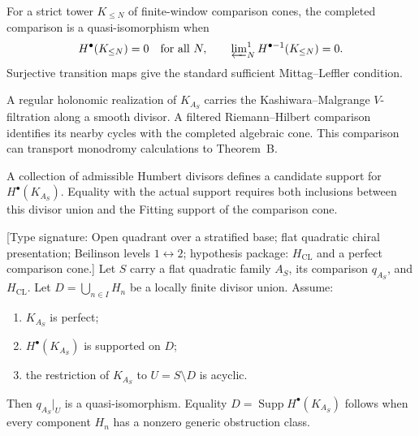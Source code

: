 \begin{remark}
\label{rem:tbsp-6-ml-per-weight}
For a strict tower \(K_{\leq N}\) of finite-window comparison cones,
the completed comparison is a quasi-isomorphism when
\[
 H^\bullet(K_{\leq N})=0
 \quad\text{for all }N,
 \qquad
 \varprojlim\nolimits^1_NH^{\bullet-1}(K_{\leq N})=0.
\]
Surjective transition maps give the standard sufficient
Mittag--Leffler condition.
\end{remark}

\begin{remark}
\label{rem:tbsp-7-dmod-vs-positselski}
A regular holonomic realization of \(K_{A_S}\) carries the
Kashiwara--Malgrange \(V\)-filtration along a smooth divisor.  A
filtered Riemann--Hilbert comparison identifies its nearby cycles
with the completed algebraic cone.  This comparison can transport
monodromy calculations to Theorem~B.
\end{remark}

\begin{remark}
\label{rem:tbsp-8-admissible-extension}
A collection of admissible Humbert divisors defines a candidate
support for \(H^\bullet(K_{A_S})\).  Equality with the actual support
requires both
inclusions between this divisor union and the Fitting support of the
comparison cone.
\end{remark}

\begin{theorem}
\label{thm:tbsp-admissible-strict-scope}
\textup{[Type signature: Open quadrant over a stratified base; flat
quadratic chiral presentation; Beilinson levels
\(1\leftrightarrow2\); hypothesis package:
\(H_{\mathrm{CL}}\) and a perfect comparison cone.]}
Let \(S\) carry a flat quadratic family \(A_S\), its comparison
\(q_{A_S}\), and \(H_{\mathrm{CL}}\).  Let
\(D=\bigcup_{n\in I}H_n\) be a locally finite divisor union.  Assume:
\begin{enumerate}[label=\textup{(A\arabic*)}]
\item \(K_{A_S}\) is perfect;
\item \(H^\bullet(K_{A_S})\) is supported on \(D\);
\item the restriction of \(K_{A_S}\) to \(U=S\setminus D\) is
 acyclic.
\end{enumerate}
Then \(q_{A_S}|_U\) is a quasi-isomorphism.  Equality
\(D=\operatorname{Supp}H^\bullet(K_{A_S})\) follows when every
component \(H_n\) has a nonzero generic obstruction class.
\end{theorem}

